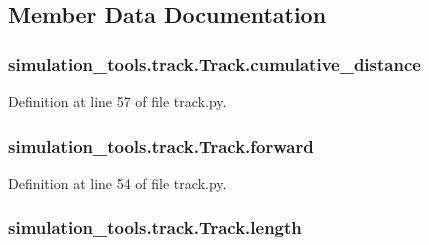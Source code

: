 \subsection{Member Data Documentation}
\subsubsection[{\texorpdfstring{cumulative\+\_\+distance}{cumulative_distance}}]{\setlength{\rightskip}{0pt plus 5cm}simulation\+\_\+tools.\+track.\+Track.\+cumulative\+\_\+distance}\hypertarget{classsimulation__tools_1_1track_1_1_track_a4513ffc3cdb1963bce98c678b093c40b}{}\label{classsimulation__tools_1_1track_1_1_track_a4513ffc3cdb1963bce98c678b093c40b}


Definition at line 57 of file track.\+py.

\subsubsection[{\texorpdfstring{forward}{forward}}]{\setlength{\rightskip}{0pt plus 5cm}simulation\+\_\+tools.\+track.\+Track.\+forward}\hypertarget{classsimulation__tools_1_1track_1_1_track_ae944fe956579cafe73bf09d3a7c072bc}{}\label{classsimulation__tools_1_1track_1_1_track_ae944fe956579cafe73bf09d3a7c072bc}


Definition at line 54 of file track.\+py.

\subsubsection[{\texorpdfstring{length}{length}}]{\setlength{\rightskip}{0pt plus 5cm}simulation\+\_\+tools.\+track.\+Track.\+length}\hypertarget{classsimulation__tools_1_1track_1_1_track_a24b60622edd3b0825f31fd6426d9380b}{}\label{classsimulation__tools_1_1track_1_1_track_a24b60622edd3b0825f31fd6426d9380b}


